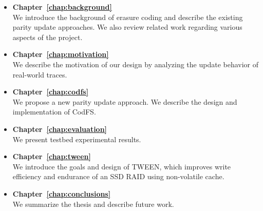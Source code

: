 \begin{itemize}
    \item 
        \textbf{Chapter~\ref{chap:background}}\\
        We introduce the background of erasure coding and describe the existing
        parity update approaches. We also review related work regarding various 
        aspects of the project.
    \item
        \textbf{Chapter~\ref{chap:motivation}}\\
        We describe the motivation of our design by analyzing the update
        behavior of real-world traces. 
    \item 
        \textbf{Chapter~\ref{chap:codfs}}\\
        We propose a new parity update approach. We
        describe the design and implementation of CodFS. 
    \item 
        \textbf{Chapter~\ref{chap:evaluation}}\\ 
        We present testbed experimental results. 
    \item 
        \textbf{Chapter~\ref{chap:tween}}\\
        We introduce the goals and design of TWEEN, which improves write
        efficiency and endurance of an SSD RAID using non-volatile cache.
    \item 
        \textbf{Chapter~\ref{chap:conclusions}}\\
        We summarize the thesis and describe future work.
\end{itemize}

